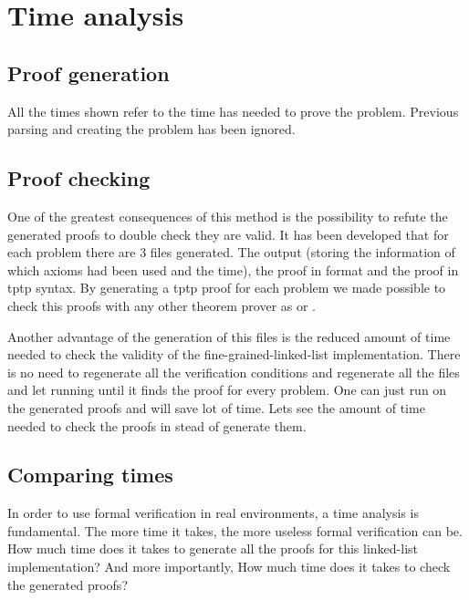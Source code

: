 \section{Time analysis}
\label{sec:timeanalysis}

\subsection{Proof generation}

All the times shown refer to the time \spass has needed to prove the problem. 
%
Previous parsing and creating the \spass problem has been ignored.



\subsection{Proof checking}

One of the greatest consequences of this method is the possibility to refute the generated proofs to double check they are valid.
%
It has been developed that for each \spass problem there are 3 files generated. The \spass output (storing the information of which axioms had been used and the time), the \spass proof in \spass format and the \spass proof in \gls{tptp} syntax.
%
By generating a tptp proof for each \spass problem we made possible to check this proofs with any other theorem prover as  or .

Another advantage of the generation of this files is the reduced amount of time needed to check the validity of the fine-grained-linked-list implementation. 
%
There is no need to regenerate all the verification conditions and regenerate all the \spass files and let \spass running until it finds the proof for every problem. 
%
One can just run \spass on the generated proofs and will save lot of time.
%
Lets see the amount of time needed to check the proofs in stead of generate them.


\subsection{Comparing times}

In order to use formal verification in real environments, a time analysis is fundamental. 
%
The more time it takes, the more useless formal verification can be.
%
How much time does it takes to generate all the proofs for this linked-list implementation? 
%
And more importantly,  How much time does it takes to check the generated proofs? 

